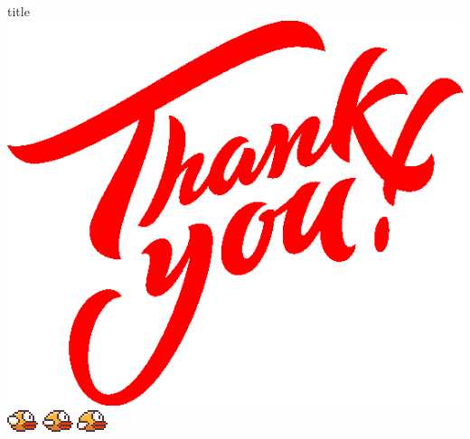 \documentclass[10pt]{beamer}
\begin{document}
{
%
\begin{frame}[plain]
    \vfill
    \begin{beamercolorbox}[center]{title}
    \includegraphics[scale=0.3]{tk.png}\\
    \includegraphics[scale=1]{bird1.png}
    \includegraphics[scale=1]{bird2.png}
    \includegraphics[scale=1]{bird3.png}
    
    \end{beamercolorbox}
    \vfill
  \end{frame}
}
\end{document}
